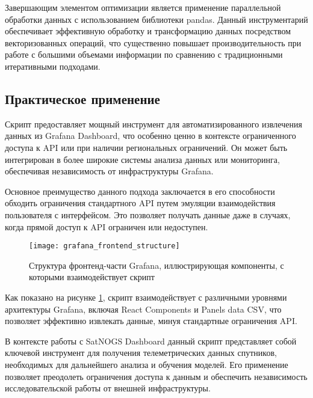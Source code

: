 Завершающим элементом оптимизации является применение параллельной обработки
данных с использованием библиотеки pandas. Данный инструментарий обеспечивает
эффективную обработку и трансформацию данных посредством векторизованных
операций, что существенно повышает производительность при работе с большими
объемами информации по сравнению с традиционными итеративными подходами.

\subsection{Практическое применение}

Скрипт предоставляет мощный инструмент для автоматизированного извлечения
данных из Grafana Dashboard, что особенно ценно в контексте ограниченного
доступа к API или при наличии региональных ограничений. Он может быть
интегрирован в более широкие системы анализа данных или мониторинга,
обеспечивая независимость от инфраструктуры Grafana.

Основное преимущество данного подхода заключается в его способности обходить
ограничения стандартного API путем эмуляции взаимодействия пользователя с
интерфейсом. Это позволяет получать данные даже в случаях, когда прямой
доступ к API ограничен или недоступен.

\begin{figure}[H]
	\centering
	\texttt{[image: grafana\_frontend\_structure]}
	\caption{Структура фронтенд-части Grafana, иллюстрирующая компоненты, с которыми взаимодействует скрипт}
	\label{fig:grafana_frontend_structure_advanced}
\end{figure}

Как показано на рисунке \ref{fig:grafana_frontend_structure_advanced}, скрипт
взаимодействует с различными уровнями архитектуры Grafana, включая React
Components и Panels data CSV, что позволяет эффективно извлекать данные, минуя
стандартные ограничения API.

В контексте работы с SatNOGS Dashboard данный скрипт представляет собой
ключевой инструмент для получения телеметрических данных спутников, необходимых
для дальнейшего анализа и обучения моделей. Его применение позволяет преодолеть
ограничения доступа к данным и обеспечить независимость исследовательской
работы от внешней инфраструктуры.
